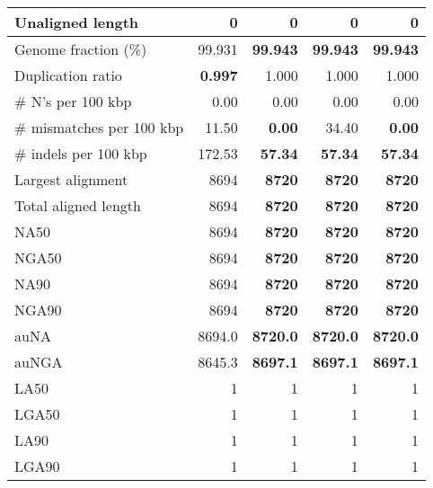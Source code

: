 \documentclass[12pt,a4paper]{article}
\begin{document}
\begin{table}[ht]
\begin{center}
\begin{tabular}{|l*{4}{|r}|}
Unaligned length & 0 & 0 & 0 & 0 \\ \hline
Genome fraction (\%) & 99.931 & {\bf 99.943} & {\bf 99.943} & {\bf 99.943} \\ \hline
Duplication ratio & {\bf 0.997} & 1.000 & 1.000 & 1.000 \\ \hline
\# N's per 100 kbp & 0.00 & 0.00 & 0.00 & 0.00 \\ \hline
\# mismatches per 100 kbp & 11.50 & {\bf 0.00} & 34.40 & {\bf 0.00} \\ \hline
\# indels per 100 kbp & 172.53 & {\bf 57.34} & {\bf 57.34} & {\bf 57.34} \\ \hline
Largest alignment & 8694 & {\bf 8720} & {\bf 8720} & {\bf 8720} \\ \hline
Total aligned length & 8694 & {\bf 8720} & {\bf 8720} & {\bf 8720} \\ \hline
NA50 & 8694 & {\bf 8720} & {\bf 8720} & {\bf 8720} \\ \hline
NGA50 & 8694 & {\bf 8720} & {\bf 8720} & {\bf 8720} \\ \hline
NA90 & 8694 & {\bf 8720} & {\bf 8720} & {\bf 8720} \\ \hline
NGA90 & 8694 & {\bf 8720} & {\bf 8720} & {\bf 8720} \\ \hline
auNA & 8694.0 & {\bf 8720.0} & {\bf 8720.0} & {\bf 8720.0} \\ \hline
auNGA & 8645.3 & {\bf 8697.1} & {\bf 8697.1} & {\bf 8697.1} \\ \hline
LA50 & 1 & 1 & 1 & 1 \\ \hline
LGA50 & 1 & 1 & 1 & 1 \\ \hline
LA90 & 1 & 1 & 1 & 1 \\ \hline
LGA90 & 1 & 1 & 1 & 1 \\ \hline
\end{tabular}
\end{center}
\end{table}
\end{document}
